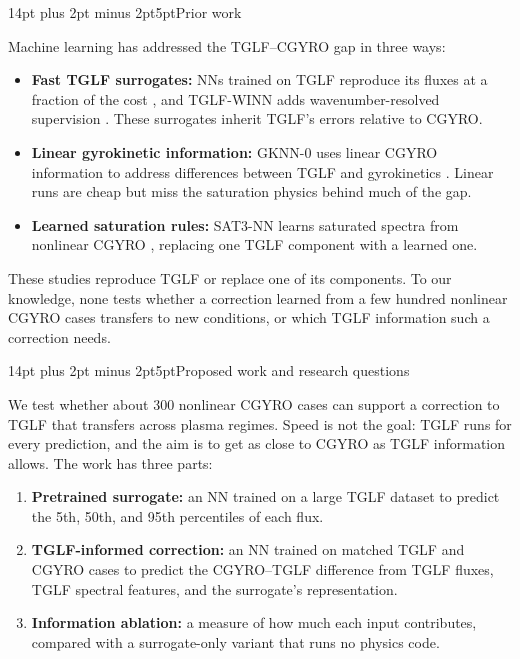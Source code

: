 \documentclass[10pt,letterpaper]{article}
\makeatletter
\renewcommand{\section}{\@startsection{section}{1}{0pt}
 {14pt plus 2pt minus 2pt}{5pt}{\normalfont\large\bfseries}}
\makeatother
\begin{document}
\section{Prior work}

Machine learning has addressed the TGLF--CGYRO gap in three ways:
\begin{itemize}
      \item \textbf{Fast TGLF surrogates:} NNs trained on TGLF reproduce its fluxes at a fraction of the cost \cite{meneghini2017}, and TGLF-WINN adds wavenumber-resolved supervision \cite{cao2026}. These surrogates inherit TGLF's errors relative to CGYRO.
      \item \textbf{Linear gyrokinetic information:} GKNN-0 uses linear CGYRO information to address differences between TGLF and gyrokinetics \cite{neiser2024}. Linear runs are cheap but miss the saturation physics behind much of the gap.
      \item \textbf{Learned saturation rules:} SAT3-NN learns saturated spectra from nonlinear CGYRO \cite{sar2026}, replacing one TGLF component with a learned one.
\end{itemize}

These studies reproduce TGLF or replace one of its components. To our knowledge, none tests whether a correction learned from a few hundred nonlinear CGYRO cases transfers to new conditions, or which TGLF information such a correction needs.

\section{Proposed work and research questions}

We test whether about 300 nonlinear CGYRO cases can support a correction to TGLF that transfers across plasma regimes. Speed is not the goal: TGLF runs for every prediction, and the aim is to get as close to CGYRO as TGLF information allows. The work has three parts:
\begin{enumerate}
      \item \textbf{Pretrained surrogate:} an NN trained on a large TGLF dataset to predict the 5th, 50th, and 95th percentiles of each flux.
      \item \textbf{TGLF-informed correction:} an NN trained on matched TGLF and CGYRO cases to predict the CGYRO--TGLF difference from TGLF fluxes, TGLF spectral features, and the surrogate's representation.
      \item \textbf{Information ablation:} a measure of how much each input contributes, compared with a surrogate-only variant that runs no physics code.
\end{enumerate}
\end{document}
